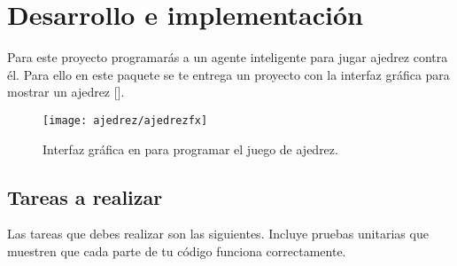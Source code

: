 \section{Desarrollo e implementación}

Para este proyecto programarás a un agente inteligente para jugar ajedrez contra él.  Para ello en este paquete se te entrega un proyecto  con la interfaz gráfica para mostrar un ajedrez [].

\begin{figure}
 \centering
 \texttt{[image: ajedrez/ajedrezfx]}
 \caption{Interfaz gráfica en  para programar el juego de ajedrez.}
 \label{fig:ajedrezfx}
\end{figure}

\subsection{Tareas a realizar}

Las tareas que debes realizar son las siguientes.  Incluye pruebas unitarias que muestren que cada parte de tu código funciona correctamente.


